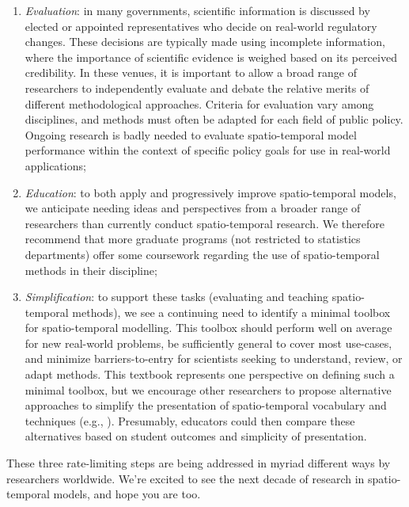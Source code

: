 \begin{enumerate}
    \item \textit{Evaluation}:  in many governments, scientific information is discussed by elected or appointed representatives who decide on real-world regulatory changes.  These decisions are typically made using incomplete information, where the importance of scientific evidence is weighed based on its perceived credibility.  In these venues, it is important to allow a broad range of researchers to independently evaluate and debate the relative merits of different methodological approaches.  Criteria for evaluation vary among disciplines, and methods must often be adapted for each field of public policy.  Ongoing research is badly needed to evaluate spatio-temporal model performance within the context of specific policy goals for use in real-world applications;    

    \item \textit{Education}:  to both apply and progressively improve spatio-temporal models, we anticipate needing ideas and perspectives from a broader range of researchers than currently conduct spatio-temporal research.  We therefore recommend that more graduate programs (not restricted to statistics departments) offer some coursework regarding the use of spatio-temporal methods in their discipline; 

    \item \textit{Simplification}:  to support these tasks (evaluating and teaching spatio-temporal methods), we see a continuing need to identify a minimal toolbox for spatio-temporal modelling. This toolbox should perform well on average for new real-world problems, be sufficiently general to cover most use-cases, and minimize barriers-to-entry for scientists seeking to understand, review, or adapt methods.  This textbook represents one perspective on defining such a minimal toolbox, but we encourage other researchers to propose alternative approaches to simplify the presentation of spatio-temporal vocabulary and techniques (e.g., \cite{wikle_spatio-temporal_2019}).  Presumably, educators could then compare these alternatives based on student outcomes and simplicity of presentation.  
\end{enumerate}
These three rate-limiting steps are being addressed in myriad different ways by researchers worldwide.  We're excited to see the next decade of research in spatio-temporal models, and hope you are too.    

